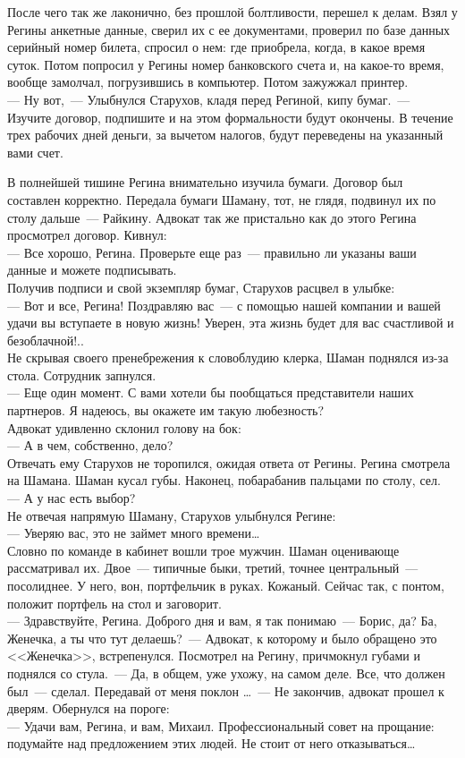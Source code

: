 После чего так же лаконично, без прошлой болтливости, перешел к делам. Взял у 
Регины анкетные данные, сверил их с ее документами, проверил по базе данных 
серийный номер билета, спросил о нем: где приобрела, когда, в какое время 
суток. Потом попросил у Регины номер банковского счета и, на какое-то время, вообще 
замолчал, погрузившись в компьютер. Потом зажужжал принтер.\\
--- Ну вот,~--- Улыбнулся Старухов, кладя перед Региной, кипу бумаг.~--- Изучите 
договор, подпишите и на этом формальности будут окончены. В течение трех 
рабочих дней деньги, за вычетом налогов, будут переведены на указанный вами счет.

В полнейшей тишине Регина внимательно изучила бумаги. Договор был составлен 
корректно. Передала бумаги Шаману, тот, не глядя, подвинул их по столу 
дальше~--- Райкину. Адвокат так же пристально как до этого Регина просмотрел договор. 
Кивнул:\\
--- Все хорошо, Регина. Проверьте еще раз~--- правильно ли указаны ваши данные и 
можете подписывать.\\
Получив подписи и свой экземпляр бумаг, Старухов расцвел в улыбке:\\
--- Вот и все, Регина! Поздравляю вас~--- с помощью нашей компании и вашей удачи 
вы вступаете в новую жизнь! Уверен, эта жизнь будет для вас счастливой и 
безоблачной!..\\
Не скрывая своего пренебрежения к словоблудию клерка, Шаман поднялся из-за 
стола. Сотрудник запнулся.\\
--- Еще один момент. С вами хотели бы пообщаться представители наших партнеров. Я 
надеюсь, вы окажете им такую любезность?\\
Адвокат удивленно склонил голову на бок:\\
--- А в чем, собственно, дело?\\
Отвечать ему Старухов не торопился, ожидая ответа от Регины. Регина смотрела на 
Шамана. Шаман кусал губы. Наконец, побарабанив пальцами по столу, сел.\\
--- А у нас есть выбор?\\
Не отвечая напрямую Шаману, Старухов улыбнулся Регине:\\
--- Уверяю вас, это не займет много времени\ldots\\

Словно по команде в кабинет вошли трое мужчин. Шаман оценивающе рассматривал 
их. Двое~--- типичные быки, третий, точнее центральный~--- посолиднее. У него, вон, 
портфельчик в руках. Кожаный. Сейчас так, с понтом, положит портфель на стол и 
заговорит.\\
--- Здравствуйте, Регина. Доброго дня и вам, я так понимаю~--- Борис, да? Ба, 
Женечка, а ты что тут делаешь?~--- Адвокат, к которому и было обращено это 
<<Женечка>>, встрепенулся. Посмотрел на Регину, причмокнул губами и поднялся со 
стула.~--- Да, в общем, уже ухожу, на самом деле. Все, что должен был~--- 
сделал. Передавай от меня поклон \ldots~--- Не закончив, адвокат прошел к дверям. 
Обернулся на пороге:\\
--- Удачи вам, Регина, и вам, Михаил. Профессиональный совет на прощание: 
подумайте над предложением этих людей. Не стоит от него отказываться\ldots


